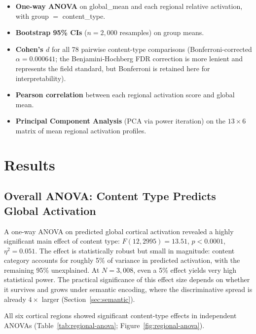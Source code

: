 \documentclass[11pt,letterpaper]{article}
\numberwithin{equation}{section}
\begin{document}
\begin{itemize}[leftmargin=1.4em,itemsep=2pt,topsep=2pt]
\item \textbf{One-way ANOVA} on global\_mean and each regional relative activation, with group $=$ content\_type.
\item \textbf{Bootstrap 95\% CIs} ($n = 2{,}000$ resamples) on group means.
\item \textbf{Cohen's $d$} for all 78 pairwise content-type comparisons (Bonferroni-corrected $\alpha = 0.000641$; the Benjamini-Hochberg FDR correction is more lenient and represents the field standard, but Bonferroni is retained here for interpretability).
\item \textbf{Pearson correlation} between each regional activation score and global mean.
\item \textbf{Principal Component Analysis} (PCA via power iteration) on the $13 \times 6$ matrix of mean regional activation profiles.
\end{itemize}

\FloatBarrier
\clearpage
\section{Results}\label{sec:results}

\subsection{Overall ANOVA: Content Type Predicts Global Activation}

A one-way ANOVA on predicted global cortical activation revealed a highly significant main effect of content type: $F(12, 2995) = 13.51$, $p < 0.0001$, $\eta^2 = 0.051$. The effect is statistically robust but small in magnitude: content category accounts for roughly 5\% of variance in predicted activation, with the remaining 95\% unexplained. At $N = 3{,}008$, even a 5\% effect yields very high statistical power. The practical significance of this effect size depends on whether it survives and grows under semantic encoding, where the discriminative spread is already $4\times$ larger (Section~\ref{sec:semantic}).

All six cortical regions showed significant content-type effects in independent ANOVAs (Table~\ref{tab:regional-anova}; Figure~\ref{fig:regional-anova}).
\end{document}
